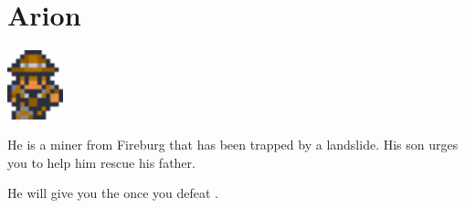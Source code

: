 \section{Arion}
\label{char:arion}

\includegraphics[height=2cm,keepaspectratio]{./resources/chars/arion}

He is a miner from Fireburg that has been trapped by a landslide. His son  urges you to help him rescue his father.

He will give you the  once you defeat .
